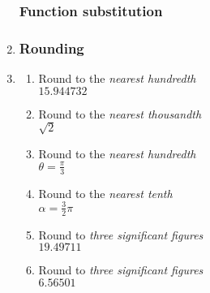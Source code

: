 \begin{enumerate}
\subsubsection*{Function substitution}
\item 
\begin{enumerate}[itemsep=2cm]
    \end{enumerate} \vspace{2cm}

\subsubsection*{Rounding}
\item
  \begin{multicols}{2}
  \begin{enumerate}[itemsep=1cm]
    \item Round to the \emph{nearest hundredth} \\[0.25cm] 
    $15.944732$
    \item Round to the \emph{nearest thousandth} \\[0.25cm]
    $\sqrt{2}$
    \item Round to the \emph{nearest hundredth} \\[0.25cm]
    $\displaystyle \theta=\frac{\pi}{3}$
    \item Round to the \emph{nearest tenth} \\[0.25cm]
    $\alpha=\frac{3}{2} \pi$  
    \item Round to \emph{three significant figures} \\[0.25cm]
    $19.49711$
    \item Round to \emph{three significant figures} \\[0.25cm]
    $6.56501$

  \end{enumerate}
  \end{multicols}


\end{enumerate}



